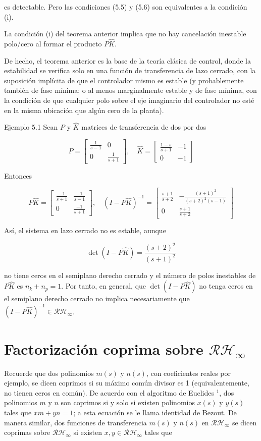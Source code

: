 es detectable. Pero las condiciones (5.5) y (5.6) son equivalentes a la condición (i).

La condición (i) del teorema anterior implica que no hay cancelación inestable polo/cero al formar el producto $P \hat{K}$.

De hecho, el teorema anterior es la base de la teoría clásica de control, donde la estabilidad se verifica solo en una función de transferencia de lazo cerrado, con la suposición implícita de que el controlador mismo es estable (y probablemente también de fase mínima; o al menos marginalmente estable y de fase mínima, con la condición de que cualquier polo sobre el eje imaginario del controlador no esté en la misma ubicación que algún cero de la planta).

Ejemplo 5.1 Sean $P$ y $\hat{K}$ matrices de transferencia de dos por dos

$$
P=\left[\begin{array}{cc}
\frac{1}{s-1} & 0 \\
0 & \frac{1}{s+1}
\end{array}\right], \quad \hat{K}=\left[\begin{array}{cc}
\frac{1-s}{s+1} & -1 \\
0 & -1
\end{array}\right]
$$

Entonces

$$
P \hat{K}=\left[\begin{array}{cc}
\frac{-1}{s+1} & \frac{-1}{s-1} \\
0 & \frac{-1}{s+1}
\end{array}\right], \quad(I-P \hat{K})^{-1}=\left[\begin{array}{cc}
\frac{s+1}{s+2} & -\frac{(s+1)^{2}}{(s+2)^{2}(s-1)} \\
0 & \frac{s+1}{s+2}
\end{array}\right]
$$

Así, el sistema en lazo cerrado no es estable, aunque

$$
\operatorname{det}(I-P \hat{K})=\frac{(s+2)^{2}}{(s+1)^{2}}
$$

no tiene ceros en el semiplano derecho cerrado y el número de polos inestables de $P \hat{K}$ es $n_{k}+n_{p}=1$. Por tanto, en general, que $\operatorname{det}(I-P \hat{K})$ no tenga ceros en el semiplano derecho cerrado no implica necesariamente que $(I-P \hat{K})^{-1} \in \mathcal{R} \mathcal{H}_{\infty}$.

\section{Factorización coprima sobre $\mathcal{R} \mathcal{H}_{\infty}$}
Recuerde que dos polinomios $m(s)$ y $n(s)$, con coeficientes reales por ejemplo, se dicen coprimos si su máximo común divisor es 1 (equivalentemente, no tienen ceros en común). De acuerdo con el algoritmo de Euclides ${ }^{1}$, dos polinomios $m$ y $n$ son coprimos si y solo si existen polinomios $x(s)$ y $y(s)$ tales que $x m+y n=1$; a esta ecuación se le llama identidad de Bezout. De manera similar, dos funciones de transferencia $m(s)$ y $n(s)$ en $\mathcal{R H}_{\infty}$ se dicen coprimas sobre $\mathcal{R} \mathcal{H}_{\infty}$ si existen $x, y \in \mathcal{R} \mathcal{H}_{\infty}$ tales que


